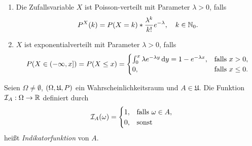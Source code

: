 \documentclass{lecture}
\begin{document}
    \begin{example}
        \begin{enumerate}
            \item Die Zufallsvariable \(X\) ist Poisson-verteilt mit Parameter \(\lambda > 0\), falls
            \[
                P^X\parentheses*{k} = P\parentheses*{X = k} * \frac{\lambda^k}{k!}e^{-\lambda}, \quad k \in \N_0.
            \]
            \item \(X\) ist exponentialverteilt mit Parameter \(\lambda > 0\), falls
            \[
                P\parentheses*{X \in \left(-\infty, x\right]} = P\parentheses*{X \le x} = \begin{cases}
                    \int_0^x \lambda e^{-\lambda y}\d y = 1 - e^{-\lambda x}, & \text{falls }x > 0,\\
                    0, & \text{falls }x \le 0.
                \end{cases}
            \]
        \end{enumerate}
    \end{example}

    \begin{definition}
        Seien \(\Omega \ne \emptyset\), \(\parentheses*{\Omega, \mathfrak{U}, P}\) ein Wahrscheinlichkeitsraum und \(A \in \mathfrak{U}\).
        Die Funktion \(\mathcal{I}_A: \Omega \to \R\) definiert durch
        \[
            \mathcal{I}_A\parentheses*{\omega} = \begin{cases}
                1, & \text{falls }\omega \in A,\\
                0, & \text{sonst}
            \end{cases}
        \]
        heißt \emph{Indikatorfunktion} von \(A\).
    \end{definition}
\end{document}
